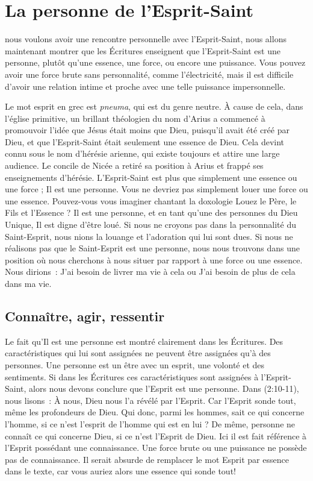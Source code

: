 \chapter{La personne de l'Esprit-Saint}

 nous voulons avoir une rencontre personnelle avec
 l'Esprit-Saint, nous allons maintenant montrer que les Écritures enseignent
 que l'Esprit-Saint est une personne, plutôt qu'une essence, une force, ou
 encore une puissance. Vous pouvez avoir une force brute sans personnalité,
 comme l'électricité, mais il est difficile d'avoir une relation intime et
 proche avec une telle puissance impersonnelle.

Le mot \og esprit \fg{} en grec est \emph{pneuma}, qui est du genre neutre.
 À cause de cela, dans l'église primitive, un brillant théologien du nom
 d'Arius a commencé à promouvoir l'idée que Jésus était moins que Dieu,
 puisqu'il avait été créé par Dieu, et que l'Esprit-Saint était seulement
 une \og essence \fg{} de Dieu. Cela devint connu sous le nom d'hérésie
 arienne, qui existe toujours et attire une large audience. Le concile de
 Nicée a retiré sa position à Arius et frappé ses enseignements d'hérésie.
 L'Esprit-Saint est plus que simplement une essence ou une force ; Il est
 une personne. Vous ne devriez pas simplement louer une force ou une essence.
 Pouvez-vous vous imaginer chantant la doxologie \og Louez le Père, le Fils
 et l'Essence \fg{} ? Il est une personne, et en tant qu'une des personnes
 du Dieu Unique, Il est digne d'être loué. Si nous ne croyons pas dans la
 personnalité du Saint-Esprit, nous nions la louange et l'adoration qui lui
 sont dues. Si nous ne réalisons pas que le Saint-Esprit est une personne,
 nous nous trouvons dans une position où nous cherchons à nous situer par
 rapport à une force ou une essence. Nous dirions~: \og J'ai besoin de livrer
 ma vie à cela \fg{} ou \og J'ai besoin de plus de cela dans ma vie.\fg


\section*{Connaître, agir, ressentir}

Le fait qu'Il est une personne est montré clairement dans les Écritures.
 Des caractéristiques qui lui sont assignées ne peuvent être assignées
 qu'à des personnes. Une personne est un être avec un esprit, une volonté et
 des sentiments. Si dans les Écritures ces caractéristiques sont assignées à
 l'Esprit-Saint, alors nous devons conclure que l'Esprit est une personne.
 Dans (2:10-11), nous lisons~: \og À nous, Dieu nous l'a
 révélé par l'Esprit. Car l'Esprit sonde tout, même les profondeurs de Dieu.
 Qui donc, parmi les hommes, sait ce qui concerne l'homme, si ce n'est
 l'esprit de l'homme qui est en lui ? De même, personne ne connaît ce qui
 concerne Dieu, si ce n'est l'Esprit de Dieu. \fg{} Ici il est fait référence
 à l'Esprit possédant une connaissance. Une force brute ou une puissance ne
 possède pas de connaissance. Il serait absurde de remplacer le mot
 \og Esprit \fg{} par \og essence \fg{} dans le texte, car vous auriez alors
 une \og essence \fg{} qui sonde tout!

